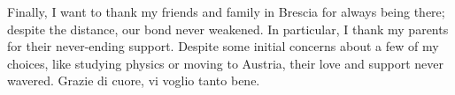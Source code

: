 Finally, I want to thank my friends and family in Brescia for always being there; despite the distance, our bond never weakened. In particular, I thank my parents for their never-ending support. Despite some initial concerns about a few of my choices, like studying physics or moving to Austria, their love and support never wavered. Grazie di cuore, vi voglio tanto bene. 












